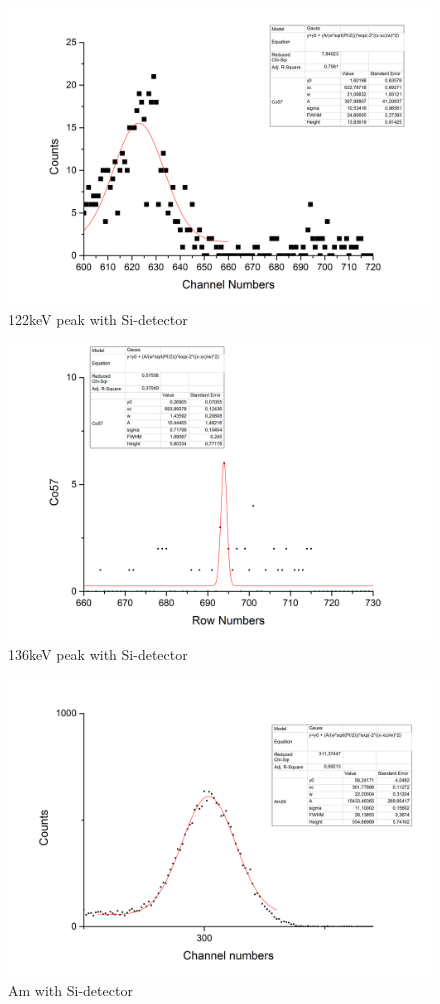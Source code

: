 \begin{figure}[h]
\begin{center}
\includegraphics[scale=0.15]{Bilder/Teil3/122keV_Si}
\caption{122keV peak with Si-detector}
\label{fig:Si122}
\end{center}
\end{figure}
\begin{figure}[h]
\begin{center}
\includegraphics[scale=0.15]{Bilder/Teil3/136keV_Si}
\caption{136keV peak with Si-detector}
\label{fig:Si136}
\end{center}
\end{figure}
\begin{figure}[h]
\begin{center}
\includegraphics[scale=0.15]{Bilder/Teil3/Am_Si}
\caption{Am with Si-detector}
\label{fig:AmSi}
\end{center}
\end{figure}